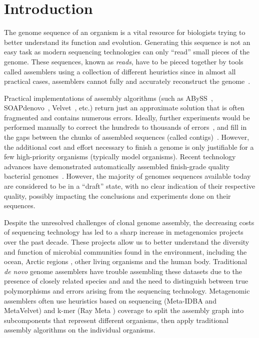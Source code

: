 \section{Introduction}
The genome sequence of an organism is a vital resource for biologists trying to better understand its function and evolution.
Generating this sequence is not an easy task as modern sequencing technologies can only ``read'' small pieces of the genome.
These sequences, known as \emph{reads}, have to be pieced together by tools called assemblers using a collection of different heuristics since in almost all practical cases, assemblers cannot fully and accurately reconstruct the genome~\cite{myers1995,medvedev2007computability}.

Practical implementations of assembly algorithms (such as ABySS~\cite{ABySS}, SOAPdenovo~\cite{SOAPdenovo}, Velvet~\cite{Velvet}, etc.) return just an approximate solution that is often fragmented and contains numerous errors.
Ideally, further experiments would be performed manually to correct the hundreds to thousands of errors~\cite{salzberg2005misassemblies}, and fill in the gaps between the chunks of assembled sequences (called contigs)~\cite{nagarajan2010finishing}.
However, the additional cost and effort necessary to finish a genome is only justifiable for a few high-priority organisms (typically model organisms).
Recent technology advances have demonstrated automatically assembled finish-grade quality bacterial genomes~\cite{chin2013nonhybrid, koren2013reducing, ribeiro2012finished}. However, the majority of genomes sequences available today are considered to be in a ``draft'' state, with no clear indication of their respective quality, possibly impacting the conclusions and experiments done on their sequences.

Despite the unresolved challenges of clonal genome assembly, the decreasing costs of sequencing technology has led to a sharp increase in metagenomics projects over the past decade.
These projects allow us to better understand the diversity and function of microbial communities found in the environment, including the ocean\cite{rusch2007sorcerer,wu2011stalking,yooseph2007sorcerer}, Arctic regions \cite{varin2012metagenomic}, other living organisms\cite{he2013comparative} and the human body\cite{gill2006metagenomic,peterson2009nih}.
Traditional \emph{de novo} genome assemblers have trouble assembling these datasets due to the presence of closely related species and and the need to distinguish between true polymorphisms and errors arising from the sequencing technology.
Metagenomic assemblers often use heuristics based on sequencing (Meta-IDBA \cite{peng2011meta} and MetaVelvet\cite{namiki2012metavelvet}) and k-mer (Ray Meta \cite{boisvert2012ray}) coverage to split the assembly graph into subcomponents that represent different organisms, then apply traditional assembly algorithms on the individual organisms.

